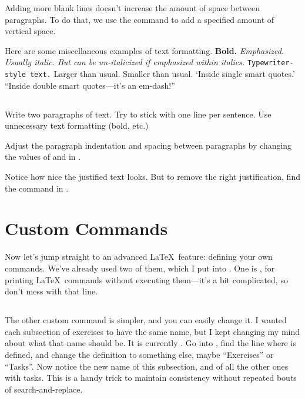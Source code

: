 \documentclass{article}
\begin{document}
\vspace{20pt}
Adding more blank lines doesn't increase the amount of space between paragraphs.
To do that, we use the \latexcode{\\vspace} command to add a specified amount of vertical space.

Here are some miscellaneous examples of text formatting.
\textbf{Bold.}
\emph{Emphasized.  Usually italic.  But can be un-italicized if \emph{emphasized} within italics.}
\texttt{Typewriter-style text.}
\large{Larger than usual.}
\small{Smaller than usual.}
`Inside single smart quotes.'
``Inside double smart quotes---it's an em-dash!''

\subsection{\task}

Write two paragraphs of text.
Try to stick with one line per sentence.
Use unnecessary text formatting (bold, etc.)

Adjust the paragraph indentation and spacing between paragraphs by changing the values of \latexcode{\\parindent} and \latexcode{\\parskip} in .

Notice how nice the justified text looks.
But to remove the right justification, find the \latexcode{\\raggedright} command in .

\section{Custom Commands}
\label{sec:custom}

Now let's jump straight to an advanced \LaTeX\ feature: defining your own commands.
We've already used two of them, which I put into .
One is \latexcode{\\latexcode}, for printing \LaTeX\ commands without executing them---it's a bit complicated, so don't mess with that line.

\subsection{\task}

The other custom command is simpler, and you can easily change it.
I wanted each subsection of exercises to have the same name, but I kept changing my mind about what that name should be.
It is currently \task.
Go into , find the line where \latexcode{\\task} is defined, and change the definition to something else, maybe ``Exercises'' or ``Tasks''.
Now notice the new name of this subsection, and of all the other ones with tasks.
This is a handy trick to maintain consistency without repeated bouts of search-and-replace.
\end{document}
